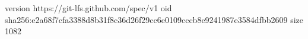 version https://git-lfs.github.com/spec/v1
oid sha256:e2a68f7cfa3388d8b31f8c36d26f29cc6e0109cccb8e9241987e3584dfbb2609
size 1082
